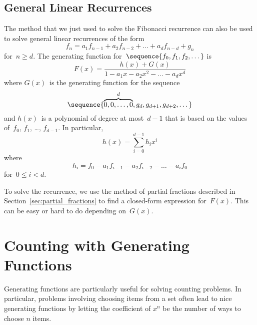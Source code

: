 \subsection{General Linear Recurrences}

The method that we just used to solve the Fibonacci recurrence can
also be used to solve general linear recurrences of the form
\begin{equation*}
    f_n = a_1 f_{n - 1} + a_2 f_{n - 2} + \dots + a_d f_{n - d} + g_n
\end{equation*}
for~$n \ge d$.  The generating function for~$\sequence{f_0, f_1, f_2,
  \dots}$ is
\begin{equation*}
F(x) = \frac{ h(x) + G(x) }{ 1 - a_1 x - a_2 x^2 - \dots - a_d x^d }
\end{equation*}
where $G(x)$~is the generating function for the sequence
\begin{equation*}
    \sequence{ \overbrace{0, 0, \dots, 0}^d, g_d, g_{d + 1}, g_{d +
        2}, \dots }
\end{equation*}
and $h(x)$~is a polynomial of degree at most~$d - 1$ that is based on
the values of~$f_0$, $f_1$, \dots, $f_{d - 1}$.  In particular,
\begin{equation*}
    h(x) = \sum_{i = 0}^{d - 1} h_i x^i
\end{equation*}
where
\begin{equation*}
    h_i = f_0 - a_1 f_{i - 1} - a_2 f_{i - 2} - \dots - a_i f_0
\end{equation*}
for~$0 \le i < d$.

To solve the recurrence, we use the method of partial fractions
described in Section~\ref{sec:partial_fractions} to find a closed-form
expression for~$F(x)$.  This can be easy or hard to do depending
on~$G(x)$.

\begin{problems}
\classproblems
{}

\homeworkproblems
{}

\end{problems}

\section{Counting with Generating Functions}

Generating functions are particularly useful for solving counting
problems.  In particular, problems involving choosing items from a set
often lead to nice generating functions by letting the coefficient of
$x^n$ be the number of ways to choose $n$ items.


